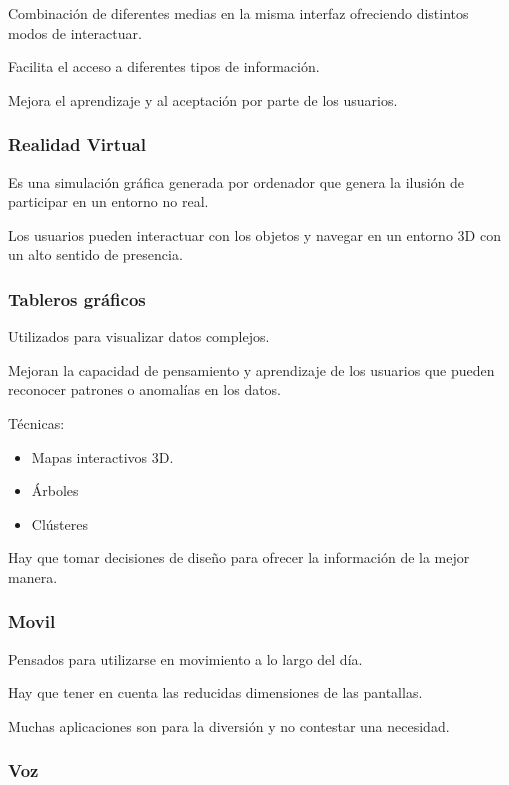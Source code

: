 \documentclass[12pt, twoside, openright]{report} %
\begin{document}
Combinación de diferentes medias en la misma interfaz ofreciendo
        distintos modos de interactuar.

		Facilita el acceso a diferentes tipos de información.

		Mejora el aprendizaje y al aceptación por parte de los usuarios.

\subsubsection{Realidad Virtual}

      
		
        Es una simulación gráfica generada por ordenador que genera la
        ilusión de participar en un entorno no real.

		Los usuarios pueden interactuar con los objetos y navegar en un
        entorno 3D con un alto sentido de presencia.
\subsubsection{Tableros gráficos}

        Utilizados para visualizar datos complejos.

		Mejoran la capacidad de pensamiento y aprendizaje de los
        usuarios que pueden reconocer patrones o anomalías en los datos.

		Técnicas:

        \begin{itemize}
        
        \item
          Mapas interactivos 3D.
        \item
          Árboles
        \item
          Clústeres
        \end{itemize}

		Hay que tomar decisiones de diseño para ofrecer la información
        de la mejor manera.

\subsubsection{Movil}
        Pensados para utilizarse en movimiento a lo largo del día.

		Hay que tener en cuenta las reducidas dimensiones de las
        pantallas.

		Muchas aplicaciones son para la diversión y no contestar una
        necesidad.

\subsubsection{Voz}
\end{document}
